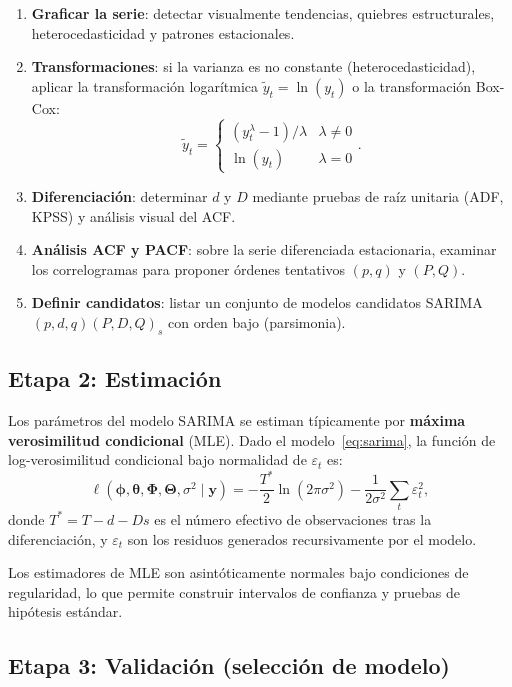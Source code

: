 \documentclass[12pt,a4paper]{article}
\begin{document}
\begin{enumerate}
  \item \textbf{Graficar la serie}: detectar visualmente tendencias, quiebres estructurales,
        heterocedasticidad y patrones estacionales.
  \item \textbf{Transformaciones}: si la varianza es no constante (heterocedasticidad),
        aplicar la transformación logarítmica $\tilde{y}_t = \ln(y_t)$ o la transformación
        Box-Cox:
        \[
          \tilde{y}_t = \begin{cases} (y_t^\lambda - 1)/\lambda & \lambda \neq 0 \\ \ln(y_t) & \lambda = 0 \end{cases}.
        \]
  \item \textbf{Diferenciación}: determinar $d$ y $D$ mediante pruebas de raíz unitaria
        (ADF, KPSS) y análisis visual del ACF.
  \item \textbf{Análisis ACF y PACF}: sobre la serie diferenciada estacionaria, examinar
        los correlogramas para proponer órdenes tentativos $(p, q)$ y $(P, Q)$.
  \item \textbf{Definir candidatos}: listar un conjunto de modelos candidatos
        SARIMA$(p,d,q)(P,D,Q)_s$ con orden bajo (parsimonia).
\end{enumerate}

\subsection{Etapa 2: Estimación}

Los parámetros del modelo SARIMA se estiman típicamente por \textbf{máxima verosimilitud
condicional} (MLE). Dado el modelo~\eqref{eq:sarima}, la función de log-verosimilitud
condicional bajo normalidad de $\varepsilon_t$ es:
\[
  \ell(\bm{\phi}, \bm{\theta}, \bm{\Phi}, \bm{\Theta}, \sigma^2 \mid \mathbf{y})
  = -\frac{T^*}{2}\ln(2\pi\sigma^2) - \frac{1}{2\sigma^2}\sum_{t}\varepsilon_t^2,
\]
donde $T^* = T - d - Ds$ es el número efectivo de observaciones tras la diferenciación, y
$\varepsilon_t$ son los residuos generados recursivamente por el modelo.

Los estimadores de MLE son asintóticamente normales bajo condiciones de regularidad, lo que
permite construir intervalos de confianza y pruebas de hipótesis estándar.

\subsection{Etapa 3: Validación (selección de modelo)}
\end{document}
